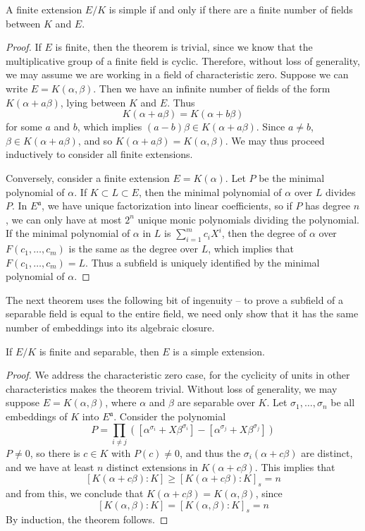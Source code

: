 \begin{theorem}
    A finite extension $E/K$ is simple if and only if there are a finite number of fields between $K$ and $E$.
\end{theorem}
\begin{proof}
    If $E$ is finite, then the theorem is trivial, since we know that the multiplicative group of a finite field is cyclic. Therefore, without loss of generality, we may assume we are working in a field of characteristic zero. Suppose we can write $E = K(\alpha, \beta)$. Then we have an infinite number of fields of the form $K(\alpha + a \beta)$, lying between $K$ and $E$. Thus
    \[ K(\alpha + a \beta) = K(\alpha + b \beta) \]
    for some $a$ and $b$, which implies $(a - b) \beta \in K(\alpha + a \beta)$. Since $a \neq b$, $\beta \in K(\alpha + a \beta)$, and so $K(\alpha + a \beta) = K(\alpha, \beta)$. We may thus proceed inductively to consider all finite extensions.

    Conversely, consider a finite extension $E = K(\alpha)$. Let $P$ be the minimal polynomial of $\alpha$. If $K \subset L \subset E$, then the minimal polynomial of $\alpha$ over $L$ divides $P$. In $E^{\mathfrak{a}}$, we have unique factorization into linear coefficients, so if $P$ has degree $n$, we can only have at most $2^n$ unique monic polynomials dividing the polynomial. If the minimal polynomial of $\alpha$ in $L$ is $\sum_{i = 1}^m c_i X^i$, then the degree of $\alpha$ over $F(c_1, \dots, c_m)$ is the same as the degree over $L$, which implies that $F(c_1, \dots, c_m) = L$. Thus a subfield is uniquely identified by the minimal polynomial of $\alpha$.
\end{proof}

The next theorem uses the following bit of ingenuity -- to prove a subfield of a separable field is equal to the entire field, we need only show that it has the same number of embeddings into its algebraic closure.

\begin{corollary}
    If $E/K$ is finite and separable, then $E$ is a simple extension.
\end{corollary}
\begin{proof}
    We address the characteristic zero case, for the cyclicity of units in other characteristics makes the theorem trivial. Without loss of generality, we may suppose $E = K(\alpha, \beta)$, where $\alpha$ and $\beta$ are separable over $K$. Let $\sigma_1, \dots, \sigma_n$ be all embeddings of $K$ into $E^{\mathfrak{a}}$. Consider the polynomial
    \[ P = \prod_{i \neq j} ([\alpha^{\sigma_i} + X \beta^{\sigma_i}] - [\alpha^{\sigma_j} + X \beta^{\sigma_j}]) \]
    $P \neq 0$, so there is $c \in K$ with $P(c) \neq 0$, and thus the $\sigma_i(\alpha + c \beta)$ are distinct, and we have at least     $n$ distinct extensions in $K(\alpha + c \beta)$. This implies that
    \[ [K(\alpha + c \beta): K] \geq [K(\alpha + c \beta): K]_s = n \]
    and from this, we conclude that $K(\alpha + c \beta) = K(\alpha, \beta)$, since
    \[ [K(\alpha, \beta) : K] = [K(\alpha, \beta): K]_s = n \]
    By induction, the theorem follows.
\end{proof}

